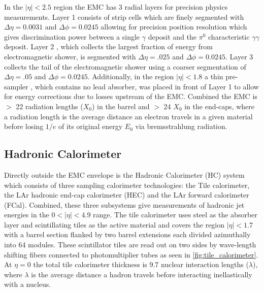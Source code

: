 In the $|\eta| < 2.5$ region the EMC has 3 radial layers for precision physics
measurements.  Layer 1 consists of strip cells which are finely segmented with
$\Delta\eta = 0.0031$ and $\Delta\phi = 0.0245$ allowing for precision position
resolution which gives discrimination power between a single $\gamma$ deposit
and the $\pi^0$ characteristic $\gamma\gamma$ deposit. Layer 2 , which collects
the largest fraction of energy from electromagnetic shower, is segmented with
$\Delta\eta = .025$ and $\Delta\phi = 0.0245$. Layer 3 collects the tail of the
electromagnetic shower using a coarser segmentation of $\Delta\eta = .05$ and
$\Delta\phi = 0.0245$.  Additionally, in the region $|\eta| < 1.8$ a thin
pre-sampler , which contains no lead absorber, was placed in front of Layer 1 to
allow for energy corrections due to losses upstream of the EMC.  Combined the
EMC is $>$ 22 radiation lengths ($X_0$) in the barrel and $>$ 24 $X_0$ in the
end-caps, where a radiation length is the average distance an electron travels
in a given material before losing $1/e$ of its original energy $E_0$ via
bremsstrahlung radiation.

\subsection{Hadronic Calorimeter}

Directly outside the EMC envelope is the Hadronic Calorimeter (HC) system
\cite{PERF-2007-01} which consists of three sampling calorimeter technologies:
the Tile calorimeter, the LAr hadronic end-cap calorimeter (HEC) and the LAr
forward calorimeter (FCal).  Combined, these three subsystems give measurements
of hadronic jet energies in the $0 <|\eta| < 4.9$ range. The tile calorimeter
uses steel as the absorber layer and scintillating tiles as the active material
and covers the region $|\eta| < 1.7$ with a barrel section flanked by two barrel
extensions each divided azimuthally into 64 modules.  These scintillator tiles
are read out on two sides by wave-length shifting fibers connected to
photomultiplier tubes as seen in \cref{fig:tile_calorimeter}. At $\eta =
0$ the total tile calorimeter thickness is 9.7 nuclear interaction lengths
($\lambda$), where $\lambda$ is the average distance a hadron travels before
interacting inellastically with a nucleus.

